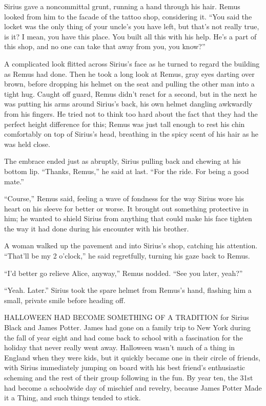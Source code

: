 Sirius gave a noncommittal grunt, running a hand through his hair. Remus looked from him to the facade of the tattoo shop, considering it. “You said the locket was the only thing of your uncle’s you have left, but that’s not really true, is it? I mean, you have this place. You built all this with his help. He’s a part of this shop, and no one can take that away from you, you know?”

A complicated look flitted across Sirius’s face as he turned to regard the building as Remus had done. Then he took a long look at Remus, gray eyes darting over brown, before dropping his helmet on the seat and pulling the other man into a tight hug. Caught off guard, Remus didn’t react for a second, but in the next he was putting his arms around Sirius’s back, his own helmet dangling awkwardly from his fingers. He tried not to think too hard about the fact that they had the perfect height difference for this; Remus was just tall enough to rest his chin comfortably on top of Sirius’s head, breathing in the spicy scent of his hair as he was held close.

The embrace ended just as abruptly, Sirius pulling back and chewing at his bottom lip. “Thanks, Remus,” he said at last. “For the ride. For being a good mate.”

“Course,” Remus said, feeling a wave of fondness for the way Sirius wore his heart on his sleeve for better or worse. It brought out something protective in him; he wanted to shield Sirius from anything that could make his face tighten the way it had done during his encounter with his brother.

A woman walked up the pavement and into Sirius’s shop, catching his attention. “That’ll be my 2 o’clock,” he said regretfully, turning his gaze back to Remus.

“I’d better go relieve Alice, anyway,” Remus nodded. “See you later, yeah?”

“Yeah. Later.” Sirius took the spare helmet from Remus’s hand, flashing him a small, private smile before heading off.


\newpage


HALLOWEEN HAD BECOME SOMETHING OF A TRADITION for Sirius Black and James Potter. James had gone on a family trip to New York during the fall of year eight and had come back to school with a fascination for the holiday that never really went away. Halloween wasn’t much of a thing in England when they were kids, but it quickly became one in their circle of friends, with Sirius immediately jumping on board with his best friend’s enthusiastic scheming and the rest of their group following in the fun. By year ten, the 31st had become a schoolwide day of mischief and revelry, because James Potter Made it a Thing, and such things tended to stick.

